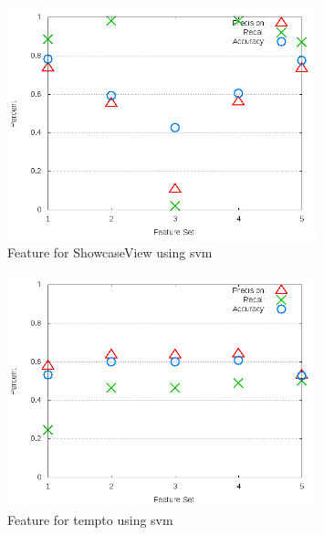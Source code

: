 \begin{figure}[!t]
\centering
\includegraphics[width=0.8\textwidth]{images/svm/test_3/ShowcaseView_sample_range.png}
\caption{Feature for ShowcaseView using \gls{svm}}
\label{fig:test_3_ShowcaseView_svm}
\end{figure}

\begin{figure}[!t]
\centering
\includegraphics[width=0.8\textwidth]{images/svm/test_3/tempto_sample_range.png}
\caption{Feature for tempto using \gls{svm}}
\label{fig:test_3_tempto_svm}
\end{figure}

